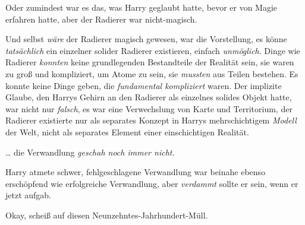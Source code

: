Oder zumindest war es das, was Harry geglaubt hatte, bevor er von Magie erfahren hatte, aber der Radierer war nicht-magisch.

Und selbst \emph{wäre} der Radierer magisch gewesen, war die Vorstellung, es könne \emph{tatsächlich} ein einzelner solider Radierer existieren, einfach \emph{unmöglich}. Dinge wie Radierer \emph{konnten} keine grundlegenden Bestandteile der Realität sein, sie waren zu groß und kompliziert, um Atome zu sein, sie \emph{mussten} aus Teilen bestehen. Es konnte keine Dinge geben, die \emph{fundamental kompliziert} waren. Der implizite Glaube, den Harrys Gehirn an den Radierer als einzelnes solides Objekt hatte, war nicht nur \emph{falsch}, es war eine Verwechslung von Karte und Territorium, der Radierer existierte nur als separates Konzept in Harrys mehrschichtigem \emph{Modell} der Welt, nicht als separates Element einer einschichtigen Realität.

… die Verwandlung \emph{geschah noch immer nicht.}

Harry atmete schwer, fehlgeschlagene Verwandlung war beinahe ebenso erschöpfend wie erfolgreiche Verwandlung, aber \emph{verdammt} sollte er sein, wenn er jetzt aufgab.

Okay, scheiß auf diesen Neunzehntes-Jahrhundert-Müll.

